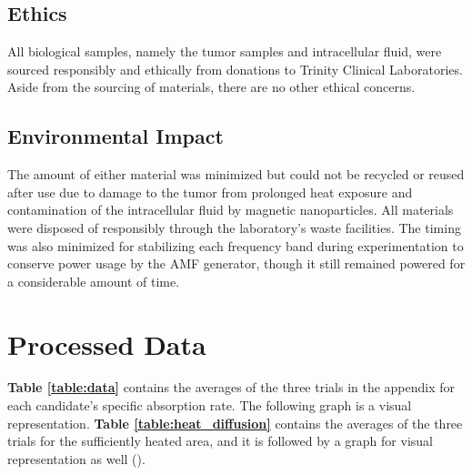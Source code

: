 \documentclass[12pt]{article}
\numberwithin{equation}{section}
\numberwithin{equation}{section}
\begin{document}
\subsection{Ethics}
{All biological samples, namely the tumor samples and intracellular fluid, were sourced responsibly and ethically from donations to Trinity Clinical Laboratories. Aside from the sourcing of materials, there are no other ethical concerns.}
\subsection{Environmental Impact}
{ The amount of either material was minimized but could not be recycled or reused after use due to damage to the tumor from prolonged heat exposure and contamination of the intracellular fluid by magnetic nanoparticles. All materials were disposed of responsibly through the laboratory's waste facilities. The timing was also minimized for stabilizing each frequency band during experimentation to conserve power usage by the AMF generator, though it still remained powered for a considerable amount of time.}

\section{Processed Data}
\textbf{Table \ref{table:data}} contains the averages of the three trials in the appendix for each candidate's specific absorption rate. The following graph is a visual representation. \textbf{Table \ref{table:heat_diffusion}} contains the averages of the three trials for the sufficiently heated area, and it is followed by a graph for visual representation as well (\cite{ChatGPT}).
\end{document}
